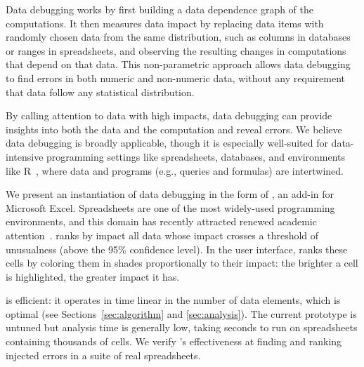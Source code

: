 Data debugging works by first building a data dependence graph of the
computations. It then measures data impact by replacing data items
with randomly chosen data from the same distribution, such as columns
in databases or ranges in spreadsheets, and observing the resulting
changes in computations that depend on that data. This non-parametric
approach allows data debugging to find errors in both numeric and
non-numeric data, without any requirement that data follow any
statistical distribution.

By calling attention to data with high impacts, data
debugging can provide insights into both the data and the computation
and reveal errors. We believe data debugging is broadly applicable, though it is
especially well-suited for data-intensive programming settings
like spreadsheets, databases, and environments like
R~\cite{ihaka1996r}, where data and programs (e.g., queries and
formulas) are intertwined.

We present an instantiation of data debugging in the form
of \checkcell{}, an add-in for Microsoft Excel. Spreadsheets are one
of the most widely-used programming environments, and this domain has
recently attracted renewed academic
attention~\cite{DBLP:conf/popl/Gulwani11,DBLP:conf/pldi/HarrisG11,Singh:2012:LSS:2212351.2212356}.
\checkcell{} ranks by impact all data whose
impact crosses a threshold of unusualness (above the 95\% confidence
level).  In the user interface, \checkcell{} ranks these cells by coloring them in
shades proportionally to their impact: the brighter a cell is
highlighted, the greater impact it has.

\checkcell{} is efficient: it operates in time linear in the number
of data elements, which is optimal (see
Sections~\ref{sec:algorithm} and \ref{sec:analysis}). The current prototype is untuned
but analysis time is generally low, taking seconds to run
on spreadsheets containing thousands of cells. We verify \checkcell{}'s effectiveness
at finding and ranking injected errors in a suite of real spreadsheets.



